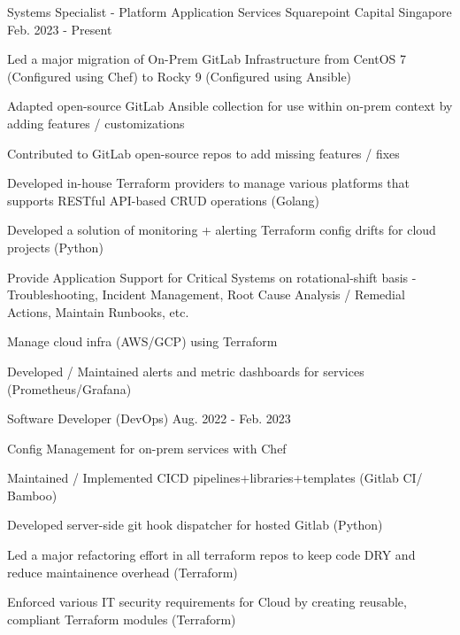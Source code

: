 

\begin{cventries}

  \cventry
    {Systems Specialist - Platform Application Services} %
    {Squarepoint Capital} %
    {Singapore} %
    {Feb. 2023 - Present} %
    {
      \begin{cvitems} %
        \item {Led a major migration of On-Prem GitLab Infrastructure from CentOS 7 (Configured using Chef) to Rocky 9 (Configured using Ansible)}
        \item {Adapted open-source GitLab Ansible collection for use within on-prem context by adding features / customizations}
        \item {Contributed to GitLab open-source repos to add missing features / fixes}
        \item {Developed in-house Terraform providers to manage various platforms that supports RESTful API-based CRUD operations (Golang)}
        \item {Developed a solution of monitoring + alerting Terraform config drifts for cloud projects (Python)}
        \item {Provide Application Support for Critical Systems on rotational-shift basis - Troubleshooting, Incident Management, Root Cause Analysis / Remedial Actions, Maintain Runbooks, etc.}
        \item {Manage cloud infra (AWS/GCP) using Terraform}
        \item {Developed / Maintained alerts and metric dashboards for services (Prometheus/Grafana)}
      \end{cvitems}
    }

  \cventry
    {Software Developer (DevOps)} %
    {} %
    {} %
    {Aug. 2022 - Feb. 2023} %
    {
      \begin{cvitems} %
        \item {Config Management for on-prem services with Chef}
        \item {Maintained / Implemented CICD pipelines+libraries+templates (Gitlab CI/ Bamboo)}
        \item {Developed server-side git hook dispatcher for hosted Gitlab (Python)}
        \item {Led a major refactoring effort in all terraform repos to keep code DRY and reduce maintainence overhead (Terraform)}
        \item {Enforced various IT security requirements for Cloud by creating reusable, compliant Terraform modules (Terraform)}
      \end{cvitems}
    }


\end{cventries}
